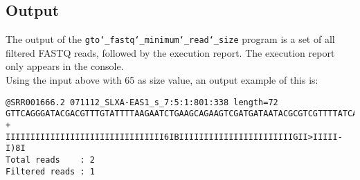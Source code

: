 \subsection*{Output}
The output of the \texttt{gto\char`_fastq\char`_minimum\char`_read\char`_size} program is a set of all filtered FASTQ reads, followed by the execution report.
The execution report only appears in the console.\\
Using the input above with 65 as size value, an output example of this is:
\begin{lstlisting}
@SRR001666.2 071112_SLXA-EAS1_s_7:5:1:801:338 length=72
GTTCAGGGATACGACGTTTGTATTTTAAGAATCTGAAGCAGAAGTCGATGATAATACGCGTCGTTTTATCAT
+
IIIIIIIIIIIIIIIIIIIIIIIIIIIIIIII6IBIIIIIIIIIIIIIIIIIIIIIIIGII>IIIII-I)8I
Total reads    : 2
Filtered reads : 1
\end{lstlisting}
